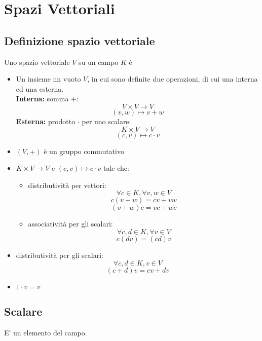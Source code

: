 \section{Spazi Vettoriali}

\subsection{Definizione spazio vettoriale}
Uno spazio vettoriale \(V\) su un campo \(K\) è

\begin{itemize}

	\item Un insieme nn vuoto \(V\), in cui sono definite due operazioni, di cui una interna ed una esterna.
	\\\textbf{Interna:} somma \(+\):
	\[V\times V\rightarrow V\]
	\[(v,w)\mapsto v+w\]
	\textbf{Esterna:} prodotto \(\cdot\) per uno scalare:
	\[K\times V\rightarrow V\]
	\[(c, v)\mapsto c\cdot v\]

	\item \((V,+)\) è un gruppo commutativo

	\item \(K\times V\rightarrow V\) e \((c, v)\mapsto c\cdot v\) tale che:

	\begin{itemize}

		\item distributività per vettori:
		\[\forall c\in K,\forall v,w\in V\]
		\[c(v+w)=cv+vw\]
		\[(v+w)c=vc+wc\]

		\item associatività per gli scalari:
		\[\forall c,d\in K, \forall v\in V\]
		\[c(dv)=(cd)v\]
		
	\end{itemize}

	\item distributività per gli scalari:
	\[\forall c,d\in K, v\in V\]
	\[(c+d)v=cv+dv\]

	\item \(1\cdot v=v\)


\end{itemize}

\subsection{Scalare}
E' un elemento del campo.
